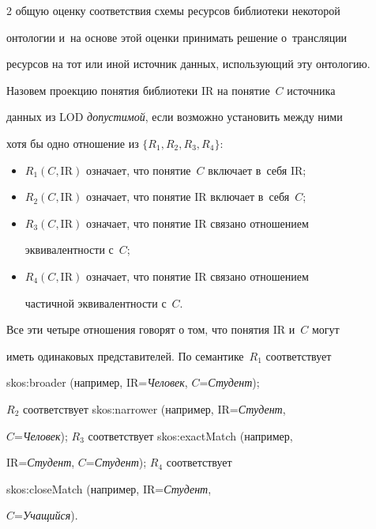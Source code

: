 \begin{multicols}{2}
общую оценку соответствия схемы ресурсов библиотеки некоторой 

онтологии и~на основе этой оценки принимать решение о~трансляции 

ресурсов на тот или иной источник данных, использующий эту онтологию.

    

    Назовем проекцию понятия библиотеки $\mathrm{IR}$ на понятие~$C$ источника 

данных из LOD \textit{допустимой}, если возможно установить между ними 

хотя бы одно отношение из $\{R_1, R_2, R_3, R_4\}$: 

    \begin{itemize}

\item $R_1(C, \mathrm{IR})$ означает, что понятие~$C$ включает в~себя $\mathrm{IR}$;

\item $R_2(C, \mathrm{IR})$ означает, что понятие $\mathrm{IR}$ включает в~себя~$C$;

\item $R_3(C, \mathrm{IR})$ означает, что понятие $\mathrm{IR}$ связано отношением 

эквивалентности с~$C$;

\item $R_4(C, \mathrm{IR})$ означает, что понятие $\mathrm{IR}$ связано отношением 

частичной эквивалентности с~$C$.

\end{itemize}



    Все эти четыре отношения говорят о том, что понятия $\mathrm{IR}$ и~$C$ могут 

иметь одинаковых представителей. По семантике~$R_1$ соответствует 

skos:broader (например, $\mathrm{IR}$\;=\;\textit{Человек}, $C$\;=\;\textit{Студент}); 

$R_2$ соответствует skos:narrower (например, $\mathrm{IR}$\;=\;\textit{Студент}, 

$C$\;=\;\textit{Человек}); $R_3$ соответствует skos:exactMatch (например, 

$\mathrm{IR}$\;=\;\textit{Студент}, $C$\;=\;\textit{Студент}); $R_4$ соответствует 

skos:closeMatch (например, $\mathrm{IR}$\;=\;\textit{Студент}, 

$C$\;=\;\textit{Учащийся}).


\end{multicols}
